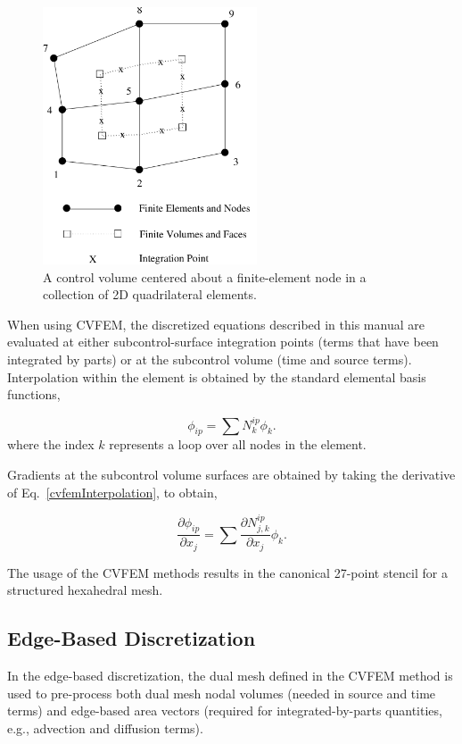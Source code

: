 \begin{figure}[h]
  \centerline{\includegraphics[height=3.0in]{images/convol}}
  \caption{A control volume centered about a finite-element node
           in a collection of 2D quadrilateral elements.}
  \label{convol}
\end{figure}

When using CVFEM, the discretized equations described in this manual
are evaluated at either subcontrol-surface integration points (terms that
have been integrated by parts) or at the subcontrol volume (time and
source terms). Interpolation within the element is obtained by the
standard elemental basis functions,

\begin{equation}
\phi_{ip} = \sum N^{ip}_k \phi_k.
\label{cvfemInterpolation}
\end{equation}
%
where the index $k$ represents a loop over all nodes in the element.

Gradients at the subcontrol volume surfaces are obtained by taking the derivative
of Eq.~\ref{cvfemInterpolation}, to obtain,

\begin{equation}
\frac{\partial \phi_{ip}}{\partial x_j} = \sum \frac{\partial N^{ip}_{j,k}} {\partial x_j} \phi_k.
\label{cvfemDerivative}
\end{equation}

The usage of the CVFEM methods results in the canonical 27-point stencil
for a structured hexahedral mesh.

\subsection{Edge-Based Discretization}
In the edge-based discretization, the dual mesh defined in the CVFEM
method is used to pre-process both dual mesh nodal volumes (needed in
source and time terms) and edge-based area vectors (required for integrated-by-parts
quantities, e.g., advection and diffusion terms).

